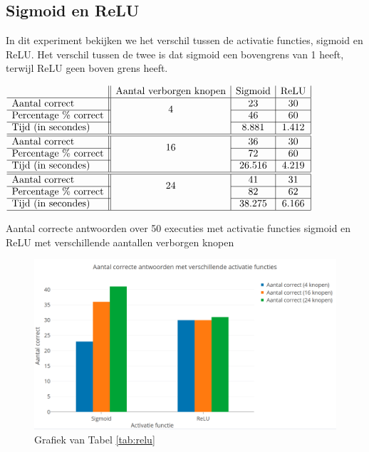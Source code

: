 \subsection{Sigmoid en ReLU}
In dit experiment bekijken we het verschil tussen de activatie functies, sigmoid en ReLU. Het verschil tussen de twee is dat sigmoid een bovengrens van 1 heeft, terwijl ReLU geen boven grens heeft.

\begin{table}[ht]
    \centering
      $\begin{array}{l || c | c | c | c}
                                    & \text{Aantal verborgen knopen} & \text{Sigmoid} & \text{ReLU} \\ \hline
        \text{Aantal correct}       & \multirow{2}{*}{4}  & 23 & 30 \\ \cline{1-1} \cline{3-4}
        \text{Percentage \% correct} &                    & 46 & 60 \\ \cline{1-1} \cline{3-4}
        \text{Tijd (in secondes)}   &                     & 8.881 & 1.412 \\ \hline \hline 
        \text{Aantal correct}       & \multirow{2}{*}{16} & 36 & 30 \\ \cline{1-1} \cline{3-4}
        \text{Percentage \% correct} &                    & 72 & 60 \\ \cline{1-1} \cline{3-4}
        \text{Tijd (in secondes)}   &                     & 26.516 & 4.219\\ \hline \hline
        \text{Aantal correct}       & \multirow{2}{*}{24} & 41 & 31\\ \cline{1-1} \cline{3-4}
        \text{Percentage \% correct} &                    & 82 & 62\\ \cline{1-1} \cline{3-4}
        \text{Tijd (in secondes)}   &                     & 38.275 & 6.166\\ \hline
      \end{array}$
    \caption{Aantal correcte antwoorden over 50 executies met activatie functies sigmoid en ReLU met verschillende aantallen verborgen knopen}
    \label{tab:relu}
\end{table}
\begin{figure}[ht!]
    \centering
    \includegraphics[scale=0.3]{graphs/g.png}
    \caption{Grafiek van Tabel \ref{tab:relu}}
    \label{fig:relu}
\end{figure}

